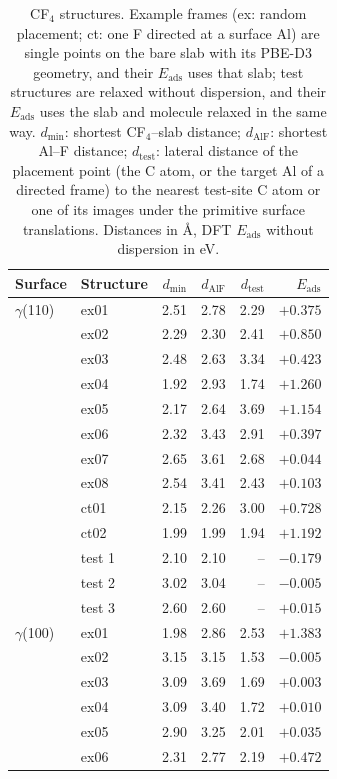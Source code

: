 \begin{table}[h]
\caption{CF$_4$ structures. Example frames (ex: random placement; ct: one F directed at a surface Al) are single points on the bare slab with its PBE-D3 geometry, and their $E_\mathrm{ads}$ uses that slab; test structures are relaxed without dispersion, and their $E_\mathrm{ads}$ uses the slab and molecule relaxed in the same way. $d_\mathrm{min}$: shortest CF$_4$--slab distance; $d_\mathrm{AlF}$: shortest Al--F distance; $d_\mathrm{test}$: lateral distance of the placement point (the C atom, or the target Al of a directed frame) to the nearest test-site C atom or one of its images under the primitive surface translations. Distances in \AA, DFT $E_\mathrm{ads}$ without dispersion in eV.}\label{tab:si-cf4-structures}
\footnotesize\renewcommand{\baselinestretch}{1}\selectfont
\begin{tabular}{llrrrr}
\toprule
Surface & Structure & $d_\mathrm{min}$ & $d_\mathrm{AlF}$ & $d_\mathrm{test}$ & $E_\mathrm{ads}$ \\
\midrule
$\gamma$(110) & ex01 & 2.51 & 2.78 & 2.29 & $+0.375$ \\
 & ex02 & 2.29 & 2.30 & 2.41 & $+0.850$ \\
 & ex03 & 2.48 & 2.63 & 3.34 & $+0.423$ \\
 & ex04 & 1.92 & 2.93 & 1.74 & $+1.260$ \\
 & ex05 & 2.17 & 2.64 & 3.69 & $+1.154$ \\
 & ex06 & 2.32 & 3.43 & 2.91 & $+0.397$ \\
 & ex07 & 2.65 & 3.61 & 2.68 & $+0.044$ \\
 & ex08 & 2.54 & 3.41 & 2.43 & $+0.103$ \\
 & ct01 & 2.15 & 2.26 & 3.00 & $+0.728$ \\
 & ct02 & 1.99 & 1.99 & 1.94 & $+1.192$ \\
 & test 1 & 2.10 & 2.10 & -- & $-0.179$ \\
 & test 2 & 3.02 & 3.04 & -- & $-0.005$ \\
 & test 3 & 2.60 & 2.60 & -- & $+0.015$ \\
$\gamma$(100) & ex01 & 1.98 & 2.86 & 2.53 & $+1.383$ \\
 & ex02 & 3.15 & 3.15 & 1.53 & $-0.005$ \\
 & ex03 & 3.09 & 3.69 & 1.69 & $+0.003$ \\
 & ex04 & 3.09 & 3.40 & 1.72 & $+0.010$ \\
 & ex05 & 2.90 & 3.25 & 2.01 & $+0.035$ \\
 & ex06 & 2.31 & 2.77 & 2.19 & $+0.472$ \\

\end{tabular}
\end{table}
